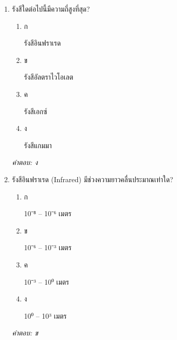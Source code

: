 \documentclass[12pt]{article}
\begin{document}
\begin{enumerate}[label=\arabic*., itemsep=0.5\baselineskip, topsep=0.5\baselineskip, leftmargin=*]
\item รังสีใดต่อไปนี้มีความถี่สูงที่สุด?
\begin{enumerate}[label=\alph*)., itemsep=0.3\baselineskip, topsep=0.3\baselineskip]
\item ก\ 
\begin{minipage}[t]{0.9\linewidth}
\raggedright รังสีอินฟราเรด
\end{minipage}
\item ข\ 
\begin{minipage}[t]{0.9\linewidth}
\raggedright รังสีอัลตราไวโอเลต
\end{minipage}
\item ค\ 
\begin{minipage}[t]{0.9\linewidth}
\raggedright รังสีเอกซ์
\end{minipage}
\item ง\ 
\begin{minipage}[t]{0.9\linewidth}
\raggedright รังสีแกมมา
\end{minipage}
\end{enumerate}
\vspace{-0.3\baselineskip}
\begin{small}
\textit{คำตอบ: ง}
\end{small}

\item รังสีอินฟราเรด (Infrared) มีช่วงความยาวคลื่นประมาณเท่าใด?
\begin{enumerate}[label=\alph*)., itemsep=0.3\baselineskip, topsep=0.3\baselineskip]
\item ก\ 
\begin{minipage}[t]{0.9\linewidth}
\raggedright 10⁻⁸ – 10⁻⁶ เมตร
\end{minipage}
\item ข\ 
\begin{minipage}[t]{0.9\linewidth}
\raggedright 10⁻⁶ – 10⁻³ เมตร
\end{minipage}
\item ค\ 
\begin{minipage}[t]{0.9\linewidth}
\raggedright 10⁻³ – 10⁰ เมตร
\end{minipage}
\item ง\ 
\begin{minipage}[t]{0.9\linewidth}
\raggedright 10⁰ – 10³ เมตร
\end{minipage}
\end{enumerate}
\vspace{-0.3\baselineskip}
\begin{small}
\textit{คำตอบ: ข}
\end{small}


\end{enumerate}
\end{document}
